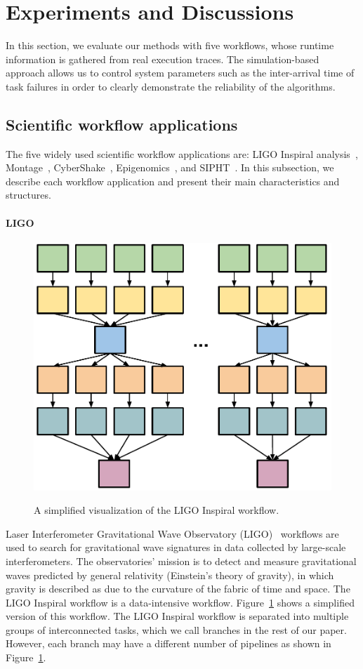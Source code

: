\documentclass{IOS-Book-Article}
\begin{document}
\section{Experiments and Discussions}
\label{sec:experiments}


In this section, we evaluate our methods with five workflows, whose runtime information is gathered from real execution traces. The simulation-based approach allows us to control system parameters such as the inter-arrival time of task failures in order to clearly demonstrate the reliability of the algorithms. 

\subsection{Scientific workflow applications}
\label{sec:applications}

The five widely used scientific workflow applications are: LIGO Inspiral analysis~\cite{LIGO}, Montage~\cite{Berriman2004}, CyberShake~\cite{Graves2010}, Epigenomics~\cite{Epigenome}, and SIPHT~\cite{SIPHT}. In this subsection, we describe each workflow application and present their main characteristics and structures.

\paragraph{\textbf{LIGO}}
\begin{figure}[!htb]
	\centering
	\includegraphics[width=0.5\linewidth]{ligo_shape.pdf} \\
	\caption{A simplified visualization of the LIGO Inspiral workflow.}
	\label{fig:evaluation_shape_ligo}
\end{figure}
Laser Interferometer Gravitational Wave Observatory (LIGO)~\cite{LIGO} workflows are used to search for gravitational wave signatures in data collected by large-scale interferometers. The observatories' mission is to detect and measure gravitational waves predicted by general relativity (Einstein's theory of gravity), in which gravity is described as due to the curvature of the fabric of time and space. The LIGO Inspiral workflow is a data-intensive workflow. Figure~\ref{fig:evaluation_shape_ligo} shows a simplified version of this workflow. The LIGO Inspiral workflow is separated into multiple groups of interconnected tasks, which we call branches in the rest of our paper. However, each branch may have a different number of pipelines as shown in Figure~\ref{fig:evaluation_shape_ligo}. 
\end{document}

